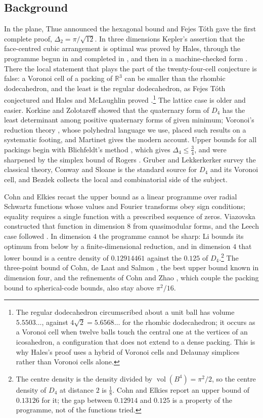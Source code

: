 \documentclass[11pt,reqno]{amsart}
\renewcommand{\_}{\origunderscore\allowbreak}
\numberwithin{equation}{section}
\theoremstyle{plain}
\theoremstyle{definition}
\theoremstyle{remark}
\DeclareMathOperator{\vol}{vol}
\begin{document}
\subsection{Background}\label{sec:history-new}

In the plane, Thue \cite{Thu10} announced the hexagonal bound and Fejes
T\'oth \cite{FT42} gave the first complete proof,
$\Delta_2=\pi/\sqrt{12}$. In three dimensions Kepler's assertion that the
face-centred cubic arrangement is optimal was proved by Hales, through the
programme begun in \cite{Hal97} and completed in \cite{Hal05}, and then in
a machine-checked form \cite{Hal17}. There the local statement that plays
the part of the twenty-four-cell conjecture is false: a Voronoi cell of a
packing of $\mathbb{R}^3$ can be smaller than the rhombic dodecahedron,
and the least is the regular dodecahedron, as Fejes T\'oth conjectured and
Hales and McLaughlin proved \cite{HM10}.\footnote{The regular dodecahedron
  circumscribed about a unit ball has volume $5.5503\ldots$, against
  $4\sqrt2=5.6568\ldots$ for the rhombic dodecahedron; it occurs as a
  Voronoi cell when twelve balls touch the central one at the vertices of
  an icosahedron, a configuration that does not extend to a dense packing.
  This is why Hales's proof uses a hybrid of Voronoi cells and Delaunay
  simplices rather than Voronoi cells alone.} The lattice case is older and
easier. Korkine and Zolotareff \cite{KZ1872} showed that the quaternary form
of $D_4$ has the least determinant among positive quaternary forms of
given minimum; Voronoi's reduction theory \cite{Vor08}, whose polyhedral
language we use, placed such results on a systematic footing, and Martinet
\cite{Mar03} gives the modern account. Upper bounds for all packings begin
with Blichfeldt's method \cite{Bli29}, which gives
$\Delta_4\le\frac34$, and were sharpened by the simplex bound of Rogers
\cite{Rog64}. Gruber and Lekkerkerker \cite{Gru87} survey the classical
theory, Conway and Sloane \cite{CS1988} is the standard source for $D_4$
and its Voronoi cell, and Bezdek \cite{Bez10} collects the local and
combinatorial side of the subject.

Cohn and Elkies \cite{CE03} recast the upper bound as a linear programme
over radial Schwartz functions whose values and Fourier transforms obey
sign conditions; equality requires a single function with a prescribed
sequence of zeros. Viazovska \cite{Via17} constructed that function in
dimension $8$ from quasimodular forms, and the Leech case followed
\cite{CKM17}. In dimension $4$ the programme cannot be sharp: Li
\cite{Li25} bounds its optimum from below by a finite-dimensional
reduction, and in dimension $4$ that lower bound is a centre density of
$0.12914461$ against the $0.125$ of $D_4$.\footnote{The centre density is
  the density divided by $\vol(B^4)=\pi^2/2$, so the centre density of
  $D_4$ at distance $2$ is $\frac{1}{8}$. Cohn and Elkies \cite{CE03}
  report an upper bound of $0.13126$ for it; the gap between $0.12914$ and
  $0.125$ is a property of the programme, not of the functions tried.} The
three-point bound of Cohn, de Laat and Salmon \cite{CdLS22}, the best upper
bound known in dimension four, and the refinements of Cohn and Zhao
\cite{CZ14}, which couple the packing bound to spherical-code bounds, also
stay above $\pi^2/16$.
\end{document}
